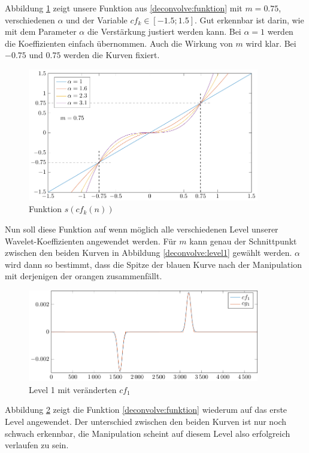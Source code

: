 Abbildung \ref{deconvolve:function} zeigt unsere Funktion aus \eqref{deconvolve:funktion} mit $m=0.75$, verschiedenen $\alpha$ und der Variable $cf_k\in[-1.5;1.5]$.
Gut erkennbar ist darin, wie mit dem Parameter $\alpha$ die Verstärkung justiert werden kann.
Bei $\alpha = 1$ werden die Koeffizienten einfach übernommen.
Auch die Wirkung von $m$ wird klar.
Bei $-0.75$ und $0.75$ werden die Kurven fixiert.
\begin{figure}[h]
\centering
\includegraphics[width=0.9\textwidth]{./papers/deconvolve/pictures/function.pdf}
\caption{Funktion $s(cf_k(n))$\label{deconvolve:function}}
\end{figure}

Nun soll diese Funktion auf wenn möglich alle verschiedenen Level unserer Wavelet-Koeffizienten angewendet werden.
Für $m$ kann genau der Schnittpunkt zwischen den beiden Kurven in Abbildung \ref{deconvolve:level1} gewählt werden.
$\alpha$ wird dann so bestimmt, dass die Spitze der blauen Kurve nach der Manipulation mit derjenigen der orangen zusammenfällt.
\begin{figure}[h]
\centering
\includegraphics[width=0.9\textwidth]{./papers/deconvolve/pictures/level/level1_n.pdf}
\caption{Level 1 mit veränderten $cf_1$\label{deconvolve:level1_n}}
\end{figure}

Abbildung \ref{deconvolve:level1_n} zeigt die Funktion \eqref{deconvolve:funktion} wiederum auf das erste Level angewendet.
Der unterschied zwischen den beiden Kurven ist nur noch schwach erkennbar, die Manipulation scheint auf diesem Level also erfolgreich verlaufen zu sein.

